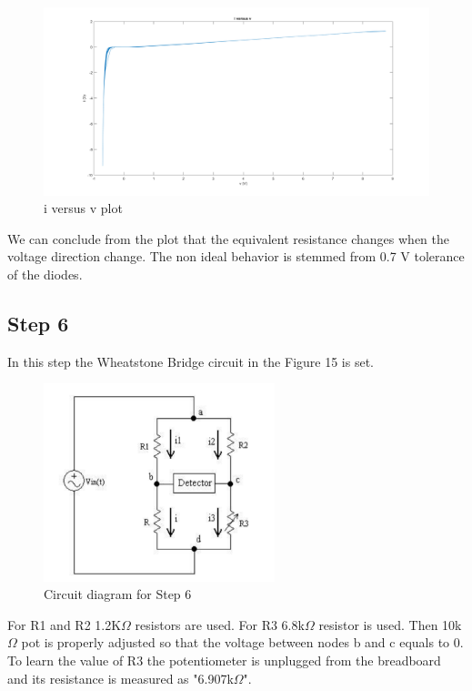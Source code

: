 \documentclass[letterpaper,12pt]{article}
\begin{document}
\begin{figure}[H]
	\centering
   \includegraphics[width=1\textwidth]{5b.png}
   \caption{i versus v plot}
\end{figure}  
We can conclude from the plot that the equivalent resistance changes when the voltage direction change. The non ideal behavior is stemmed from 0.7 V tolerance of the diodes.


\subsection{Step 6}
In this step the Wheatstone Bridge circuit in the Figure 15 is set.  
\begin{figure}[H]
	\centering
   \includegraphics[width=0.6\textwidth]{6.png}
   \caption{Circuit diagram for Step 6}
\end{figure}  
For R1 and R2 1.2K\(\Omega\) resistors are used. For R3 6.8k\(\Omega\) resistor is used. Then 10k\(\Omega\) pot is properly adjusted so that the voltage between nodes b and c equals to 0. To learn the value of R3 the potentiometer is unplugged from the breadboard and its resistance is measured as "6.907k\(\Omega\)".
\end{document}
